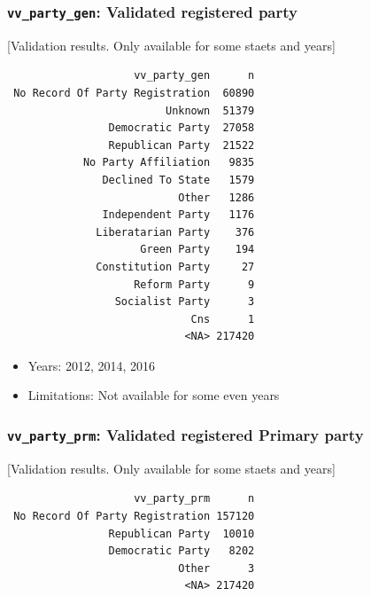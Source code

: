 \documentclass[10pt,article,oneside]{memoir}
\theoremstyle{definition}
\begin{document}
\hypertarget{vv_party_gen-validated-registered-party}{%
\subsubsection{\texorpdfstring{\texttt{vv\_party\_gen}: Validated
registered
party}{vv\_party\_gen: Validated registered party}}\label{vv_party_gen-validated-registered-party}}

{[}Validation results. Only available for some staets and years{]}

\begin{verbatim}
                    vv_party_gen      n
 No Record Of Party Registration  60890
                         Unknown  51379
                Democratic Party  27058
                Republican Party  21522
            No Party Affiliation   9835
               Declined To State   1579
                           Other   1286
               Independent Party   1176
              Liberatarian Party    376
                     Green Party    194
              Constitution Party     27
                    Reform Party      9
                 Socialist Party      3
                             Cns      1
                            <NA> 217420
\end{verbatim}

\begin{itemize}
\tightlist
\item
  Years: 2012, 2014, 2016
\item
  Limitations: Not available for some even years
\end{itemize}

\hypertarget{vv_party_prm-validated-registered-primary-party}{%
\subsubsection{\texorpdfstring{\texttt{vv\_party\_prm}: Validated
registered Primary
party}{vv\_party\_prm: Validated registered Primary party}}\label{vv_party_prm-validated-registered-primary-party}}

{[}Validation results. Only available for some staets and years{]}

\begin{verbatim}
                    vv_party_prm      n
 No Record Of Party Registration 157120
                Republican Party  10010
                Democratic Party   8202
                           Other      3
                            <NA> 217420
\end{verbatim}
\end{document}
